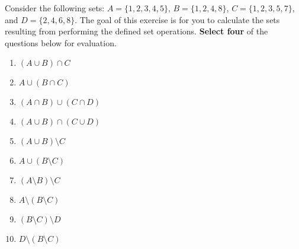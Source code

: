 \documentclass[11pt]{article}
\newcommand{\myset}[1]{\{#1\}}
\begin{document}
%
%  
%  
%  
%

\begin{myExercise}
Consider the following sets: $A = \myset{1,2,3,4,5}$, $B = \myset{1,2,4,8}$, $C = \myset{1,2,3,5,7}$, and $D = \myset{2,4,6,8}$. The goal of this exercise is for you to calculate the sets resulting from performing the defined set operations.  \textbf{Select four} of the questions below for evaluation.
\begin{enumerate}[label=(\alph*)]
\item $(A \cup B)  \cap C$
\item $A \cup (B \cap C)$
\item $(A \cap B) \cup (C \cap D)$
\item $(A \cup B) \cap (C \cup D)$
\item $(A \cup B) \setminus C$
\item $A \cup (B \setminus C)$
\item $(A \setminus B) \setminus C$
\item $A \setminus (B \setminus C)$
\item $(B \setminus C) \setminus D$
\item $D \setminus (B \setminus C)$
\end{enumerate}

\end{myExercise}
\end{document}

